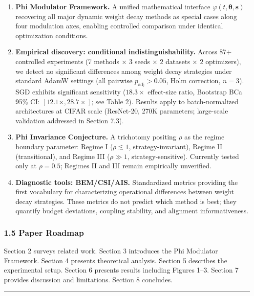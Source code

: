 \documentclass[
]{article}
\begin{document}
\begin{enumerate}
\def\labelenumi{\arabic{enumi}.}
\item
  \textbf{Phi Modulator Framework.} A unified mathematical interface
  \(\varphi(t, \boldsymbol{\theta}, \mathbf{s})\) recovering all major
  dynamic weight decay methods as special cases along four modulation
  axes, enabling controlled comparison under identical optimization
  conditions.
\item
  \textbf{Empirical discovery: conditional indistinguishability.} Across
  87+ controlled experiments (7 methods \(\times\) 3 seeds \(\times\) 2
  datasets \(\times\) 2 optimizers), we detect no significant
  differences among weight decay strategies under standard AdamW
  settings (all pairwise \(p_{\text{adj}} > 0.05\), Holm correction,
  \(n = 3\)). SGD exhibits significant sensitivity (\(18.3\times\)
  effect-size ratio, Bootstrap BCa 95\% CI:
  \([12.1\times, 28.7\times]\); see Table 2). Results apply to
  batch-normalized architectures at CIFAR scale (ResNet-20, 270K
  parameters; large-scale validation addressed in Section 7.3).
\item
  \textbf{Phi Invariance Conjecture.} A trichotomy positing \(\rho\) as
  the regime boundary parameter: Regime I (\(\rho \lesssim 1\),
  strategy-invariant), Regime II (transitional), and Regime III
  (\(\rho \gg 1\), strategy-sensitive). Currently tested only at
  \(\rho = 0.5\); Regimes II and III remain empirically unverified.
\item
  \textbf{Diagnostic tools: BEM/CSI/AIS.} Standardized metrics providing
  the first vocabulary for characterizing operational differences
  between weight decay strategies. These metrics do not predict which
  method is best; they quantify budget deviations, coupling stability,
  and alignment informativeness.
\end{enumerate}

\hypertarget{paper-roadmap}{%
\subsubsection{1.5 Paper Roadmap}\label{paper-roadmap}}

Section 2 surveys related work. Section 3 introduces the Phi Modulator
Framework. Section 4 presents theoretical analysis. Section 5 describes
the experimental setup. Section 6 presents results including Figures
1--3. Section 7 provides discussion and limitations. Section 8
concludes.

\begin{center}\rule{0.5\linewidth}{0.5pt}\end{center}
\end{document}
